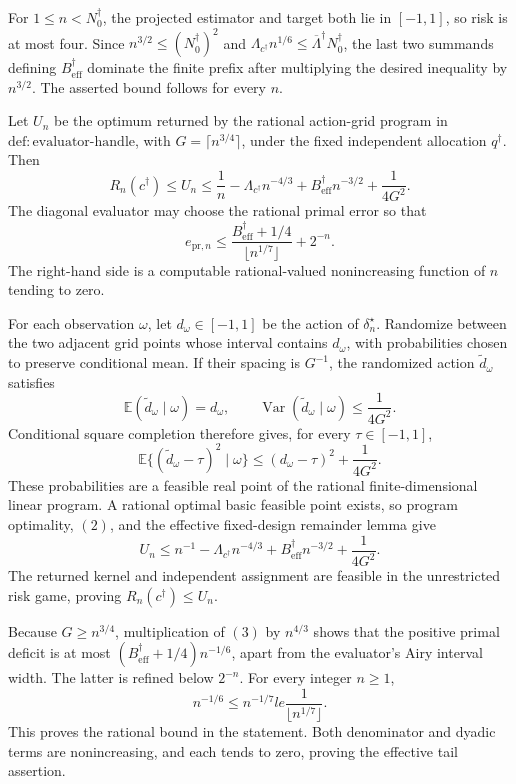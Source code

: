 For \(1\le n<N_0^\dagger\), the projected estimator and target both lie in \([-1,1]\), so risk is at most four.  Since
\(n^{3/2}\le(N_0^\dagger)^2\) and
\(\Lambda_{c^\dagger}n^{1/6}\le\overline\Lambda^\dagger N_0^\dagger\), the last two summands defining
\(B_{\mathrm{eff}}^\dagger\) dominate the finite prefix after multiplying the desired inequality by \(n^{3/2}\).  The asserted bound follows for every \(n\).

Let \(U_n\) be the optimum returned by the rational action-grid program in
\(\mathrm{def:evaluator\text{-}handle}\), with
\(G=\lceil n^{3/4}\rceil\), under the fixed independent allocation
\(q^\dagger\).  Then
\[
R_n(c^\dagger)\le U_n
\le\frac1n-\Lambda_{c^\dagger}n^{-4/3}
+B_{\mathrm{eff}}^\dagger n^{-3/2}+\frac1{4G^2}.
\]
The diagonal evaluator may choose the rational primal error so that
\[
e_{\mathrm{pr},n}\le
\frac{B_{\mathrm{eff}}^\dagger+1/4}
{\lfloor n^{1/7}\rfloor}+2^{-n}.
\]
The right-hand side is a computable rational-valued nonincreasing function of \(n\) tending to zero.

For each observation \(\omega\), let \(d_\omega\in[-1,1]\) be the action of
\(\delta_n^\star\).  Randomize between the two adjacent grid points whose interval contains \(d_\omega\), with probabilities chosen to preserve conditional mean.  If their spacing is \(G^{-1}\), the randomized action
\(\widetilde d_\omega\) satisfies
\[
\mathbb E(\widetilde d_\omega\mid\omega)=d_\omega,
\qquad
\operatorname{Var}(\widetilde d_\omega\mid\omega)\le\frac1{4G^2}.
\tag{1}
\]
Conditional square completion therefore gives, for every
\(\tau\in[-1,1]\),
\[
\mathbb E\{(\widetilde d_\omega-\tau)^2\mid\omega\}
\le(d_\omega-\tau)^2+\frac1{4G^2}.
\tag{2}
\]
These probabilities are a feasible real point of the rational finite-dimensional linear program.  A rational optimal basic feasible point exists, so program optimality, \((2)\), and the effective fixed-design remainder lemma give
\[
U_n\le n^{-1}-\Lambda_{c^\dagger}n^{-4/3}
+B_{\mathrm{eff}}^\dagger n^{-3/2}+\frac1{4G^2}.
\tag{3}
\]
The returned kernel and independent assignment are feasible in the unrestricted risk game, proving \(R_n(c^\dagger)\le U_n\).

Because \(G\ge n^{3/4}\), multiplication of \((3)\) by \(n^{4/3}\) shows that the positive primal deficit is at most
\((B_{\mathrm{eff}}^\dagger+1/4)n^{-1/6}\), apart from the evaluator's Airy interval width.  The latter is refined below \(2^{-n}\).  For every integer \(n\ge1\),
\[
n^{-1/6}\le n^{-1/7}le\frac1{\lfloor n^{1/7}\rfloor}.
\]
This proves the rational bound in the statement.  Both denominator and dyadic terms are nonincreasing, and each tends to zero, proving the effective tail assertion.

